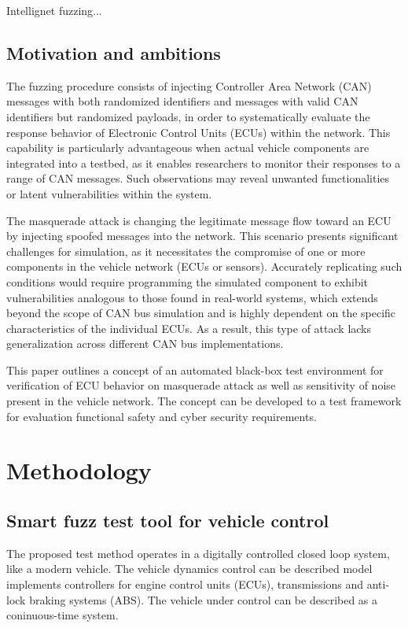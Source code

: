 \documentclass[a4paper, fleqn]{template/cas-dc}
\begin{document}
	Intellignet fuzzing...
	\cite{zhu2022fuzzing}
	
	\subsection{Motivation and ambitions}
	
	The fuzzing procedure consists of injecting Controller Area Network (CAN) messages with both randomized identifiers and messages with valid CAN identifiers but randomized payloads, in order to systematically evaluate the response behavior of Electronic Control Units (ECUs) within the network. This capability is particularly advantageous when actual vehicle components are integrated into a testbed, as it enables researchers to monitor their responses to a range of CAN messages. Such observations may reveal unwanted functionalities or latent vulnerabilities within the system. 
	
	The masquerade attack is changing the legitimate message flow toward an ECU by injecting spoofed messages into the network. This scenario presents significant challenges for simulation, as it necessitates the compromise of one or more components in the vehicle network (ECUs or sensors). Accurately replicating such conditions would require programming the simulated component to exhibit vulnerabilities analogous to those found in real-world systems, which extends beyond the scope of CAN bus simulation and is highly dependent on the specific characteristics of the individual ECUs. As a result, this type of attack lacks generalization across different CAN bus implementations.
	
	This paper outlines a concept of an automated black-box test environment for verification of ECU behavior on masquerade attack as well as sensitivity of noise present in the vehicle network. The concept can be developed to a test framework for evaluation functional safety and cyber security requirements.
	
	\section{Methodology}
	\subsection{Smart fuzz test tool for vehicle control}
	
	The proposed test method operates in a digitally controlled closed loop system, like a modern vehicle. The vehicle dynamics control can be described model implements controllers for engine control units (ECUs), transmissions and anti-lock braking systems (ABS). The vehicle under control can be described as a coninuous-time system.
	
\end{document}
